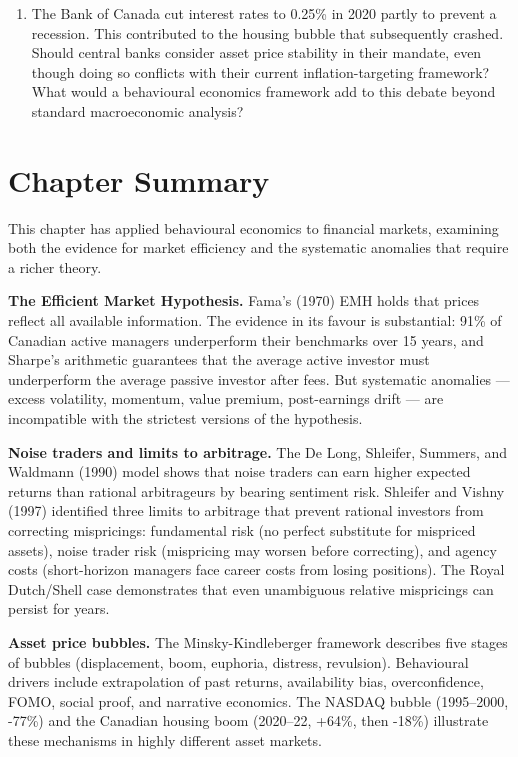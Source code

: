 \documentclass[12pt, letterpaper]{article}
\begin{document}
\begin{enumerate}
\item The Bank of Canada cut interest rates to 0.25\% in 2020 partly to prevent a recession. This contributed to the housing bubble that subsequently crashed. Should central banks consider asset price stability in their mandate, even though doing so conflicts with their current inflation-targeting framework? What would a behavioural economics framework add to this debate beyond standard macroeconomic analysis?
\end{enumerate}

\medskip


\section*{Chapter Summary}


This chapter has applied behavioural economics to financial markets, examining both the evidence for market efficiency and the systematic anomalies that require a richer theory.

\textbf{The Efficient Market Hypothesis.} Fama's (1970) EMH holds that prices reflect all available information. The evidence in its favour is substantial: 91\% of Canadian active managers underperform their benchmarks over 15 years, and Sharpe's arithmetic guarantees that the average active investor must underperform the average passive investor after fees. But systematic anomalies --- excess volatility, momentum, value premium, post-earnings drift --- are incompatible with the strictest versions of the hypothesis.

\textbf{Noise traders and limits to arbitrage.} The De Long, Shleifer, Summers, and Waldmann (1990) model shows that noise traders can earn higher expected returns than rational arbitrageurs by bearing sentiment risk. Shleifer and Vishny (1997) identified three limits to arbitrage that prevent rational investors from correcting mispricings: fundamental risk (no perfect substitute for mispriced assets), noise trader risk (mispricing may worsen before correcting), and agency costs (short-horizon managers face career costs from losing positions). The Royal Dutch/Shell case demonstrates that even unambiguous relative mispricings can persist for years.

\textbf{Asset price bubbles.} The Minsky-Kindleberger framework describes five stages of bubbles (displacement, boom, euphoria, distress, revulsion). Behavioural drivers include extrapolation of past returns, availability bias, overconfidence, FOMO, social proof, and narrative economics. The NASDAQ bubble (1995--2000, -77\%) and the Canadian housing boom (2020--22, +64\%, then -18\%) illustrate these mechanisms in highly different asset markets.
\end{document}

